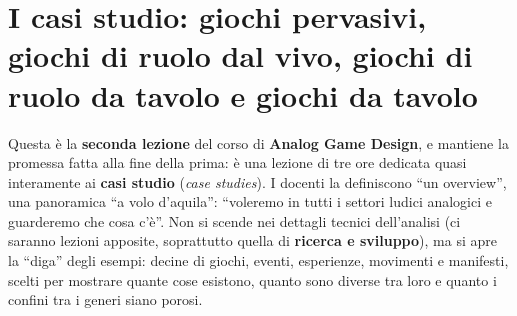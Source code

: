 %
%
%    
%    
%

\chapter[I casi studio dell'Analog Game Design]{I casi studio: giochi
pervasivi, giochi di ruolo dal vivo, giochi di ruolo da tavolo e giochi da
tavolo}
\label{a2:cap:casi}

Questa è la \textbf{seconda lezione} del corso di \textbf{Analog Game Design}, e
mantiene la promessa fatta alla fine della prima: è una lezione di tre ore
dedicata quasi interamente ai \textbf{casi studio} (\emph{case studies}). I
docenti la definiscono ``un overview'', una panoramica ``a volo d'aquila'':
``voleremo in tutti i settori ludici analogici e guarderemo che cosa c'è''.
Non si scende nei dettagli tecnici dell'analisi (ci saranno lezioni apposite,
soprattutto quella di \textbf{ricerca e sviluppo}), ma si apre la ``diga'' degli
esempi: decine di giochi, eventi, esperienze, movimenti e manifesti, scelti per
mostrare quante cose esistono, quanto sono diverse tra loro e quanto i confini
tra i generi siano porosi.

